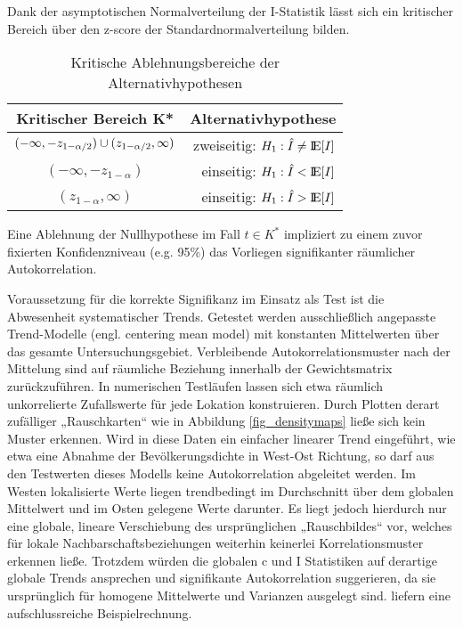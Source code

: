 Dank der asymptotischen Normalverteilung der I-Statistik lässt sich ein kritischer Bereich über den z-score der Standardnormalverteilung bilden.

\begin{table}[h!]
    \begin{center}
    \begin{tabular}{c r}
        {\sc Kritischer Bereich K*}    & {\sc Alternativhypothese}  \\
    \hline
        {$(-\infty,-z_{1-\alpha/2}) \cup (z_{1-\alpha/2},\infty)$}    & {zweiseitig: $H_1: \hat{I} \neq {\rm I\!E}[I]$} \\
        {$(-\infty,-z_{1-\alpha}) $}                                    & {einseitig: $H_1: \hat{I} < {\rm I\!E}[I]$} \\
        {$   (z_{1-\alpha},\infty)$}                                    & {einseitig: $H_1: \hat{I} > {\rm I\!E}[I]$} \\
    \hline
    \end{tabular}
    \end{center}
    \caption{Kritische Ablehnungsbereiche der Alternativhypothesen}
\end{table}

Eine Ablehnung der Nullhypothese im Fall $t \in K^{*}$ impliziert zu einem zuvor fixierten Konfidenzniveau (e.g. 95\%) das Vorliegen signifikanter räumlicher Autokorrelation.

Voraussetzung für die korrekte Signifikanz im Einsatz als Test ist die Abwesenheit systematischer Trends. 
Getestet werden ausschließlich angepasste Trend-Modelle (engl. centering mean model) mit konstanten Mittelwerten über das gesamte Untersuchungsgebiet. 
Verbleibende Autokorrelationsmuster nach der Mittelung sind auf räumliche Beziehung innerhalb der Gewichtsmatrix zurückzuführen. 
In numerischen Testläufen lassen sich etwa räumlich unkorrelierte Zufallswerte für jede Lokation konstruieren. 
Durch Plotten derart zufälliger „Rauschkarten“ wie in Abbildung \ref{fig_densitymaps} ließe sich kein Muster erkennen. 
Wird in diese Daten ein einfacher linearer Trend eingeführt, wie etwa eine Abnahme der Bevölkerungsdichte in West-Ost Richtung, 
so darf aus den Testwerten dieses Modells keine Autokorrelation abgeleitet werden. 
Im Westen lokalisierte Werte liegen trendbedingt im Durchschnitt über dem globalen Mittelwert und im Osten gelegene Werte darunter. 
Es liegt jedoch hierdurch nur eine globale, lineare Verschiebung des ursprünglichen „Rauschbildes“ vor, 
welches für lokale Nachbarschaftsbeziehungen weiterhin keinerlei Korrelationsmuster erkennen ließe. 
Trotzdem würden die globalen c und I Statistiken auf derartige globale Trends ansprechen und signifikante Autokorrelation suggerieren, 
da sie ursprünglich für homogene Mittelwerte und Varianzen ausgelegt sind. 
\cite[S.22]{schabenberger_statistical_2005} liefern eine aufschlussreiche Beispielrechnung. \\

